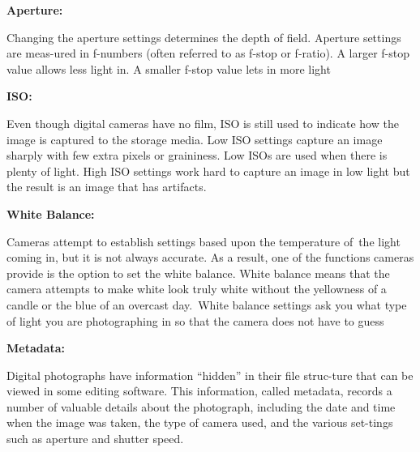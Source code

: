 \documentclass{report}
\begin{document}
    \bigbreak \noindent \bigbreak \noindent 
    \begin{Large}
        \textbf{Aperture:}
    \end{Large}

    \bigbreak \noindent 
    Changing the aperture settings determines the depth of field. Aperture settings are meas-ured in f-numbers (often referred to as f-stop or f-ratio). A larger f-stop value allows less light in. A smaller f-stop value lets in more light

    \bigbreak \noindent \bigbreak \noindent 
    \begin{Large}
        \textbf{ISO:}
    \end{Large}

    \bigbreak \noindent 
    Even though digital cameras have no film, ISO is still used to indicate how the image is captured to the storage media. Low ISO settings capture an image sharply with few extra pixels or graininess. Low ISOs are used when there is plenty of light. High ISO settings work hard to capture an image in low light but the result is an image that has artifacts.

    \bigbreak \noindent 

    \bigbreak \noindent \bigbreak \noindent 
    \begin{Large}
        \textbf{White Balance:}
    \end{Large}

    \bigbreak \noindent 
    Cameras attempt to establish settings based upon the temperature of the light coming in, but it is not always accurate. As a result, one of the functions cameras provide is the option to set the white balance. White balance means that the camera attempts to make white look truly white without the yellowness of a candle or the blue of an overcast day. White balance settings ask you what type of light you are photographing in so that the camera does not have to guess

    \bigbreak \noindent \bigbreak \noindent 
    \begin{Large}
        \textbf{Metadata:}
    \end{Large}
    
    \bigbreak \noindent 
    Digital photographs have information “hidden” in their file struc-ture that can be viewed in some editing software. This information, called metadata, records a number of valuable details about the photograph, including the date and time when the image was taken, the type of camera used, and the various set-tings such as aperture and shutter speed.
\end{document}

